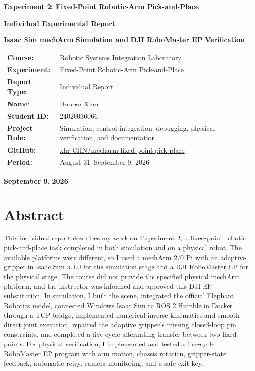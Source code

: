 \documentclass[UTF8,zihao=-4,scheme=chinese,fontset=none]{ctexart}
\renewcommand{\arraystretch}{1.22}
\begin{document}
\begin{titlepage}
\thispagestyle{empty}
\begin{center}
\vspace*{1.6cm}
{\bfseries{}Experiment 2: Fixed-Point Robotic-Arm Pick-and-Place\par}
\vspace{.7cm}
{\bfseries{}Individual Experimental Report\par}
\vspace{.35cm}
{\bfseries{}Isaac Sim mechArm Simulation and DJI RoboMaster EP Verification\par}
\vspace{2.0cm}
\renewcommand{\arraystretch}{1.9}
\begin{tabular}{>{\bfseries}p{3.3cm}p{8.0cm}}
Course: & Robotic Systems Integration Laboratory\\
Experiment: & Fixed-Point Robotic-Arm Pick-and-Place\\
Report Type: & Individual Report\\
Name: & Haoran Xiao\\
Student ID: & 24020036066\\
Project Role: & Simulation, control integration, debugging, physical verification, and documentation\\
GitHub: & \href{https://github.com/xhr-CHN/mecharm-fixed-point-pick-place}{xhr-CHN/mecharm-fixed-point-pick-place}\\
Period: & August 31--September 9, 2026\\
\end{tabular}
\vfill
{\bfseries{}September 9, 2026\par}
\end{center}
\end{titlepage}

\setcounter{page}{1}

\section*{Abstract}
This individual report describes my work on Experiment 2, a fixed-point robotic pick-and-place task completed in both simulation and on a physical robot. The available platforms were different, so I used a mechArm 270 Pi with an adaptive gripper in Isaac Sim 5.1.0 for the simulation stage and a DJI RoboMaster EP for the physical stage. The course did not provide the specified physical mechArm platform, and the instructor was informed and approved this DJI EP substitution. In simulation, I built the scene, integrated the official Elephant Robotics model, connected Windows Isaac Sim to ROS 2 Humble in Docker through a TCP bridge, implemented numerical inverse kinematics and smooth direct joint execution, repaired the adaptive gripper's missing closed-loop pin constraints, and completed a five-cycle alternating transfer between two fixed points. For physical verification, I implemented and tested a five-cycle RoboMaster EP program with arm motion, chassis rotation, gripper-state feedback, automatic retry, camera monitoring, and a safe-exit key.
\end{document}
